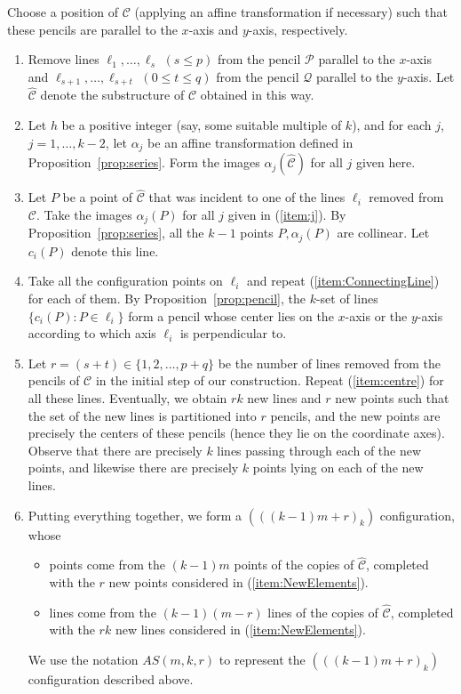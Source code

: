 \documentclass[reqno,12pt]{amsart}
\theoremstyle{plain}
\theoremstyle{definition}
\theoremstyle{remark}
\newcommand{\mc}[1]{\mathcal{#1}}
\begin{document}
Choose a position of $\mathcal C$ (applying an affine transformation if necessary) such that these pencils are parallel to the 
$x$-axis and $y$-axis, respectively. 
%
\begin{enumerate}
%
\item
Remove lines $\ell_1,\dots, \ell_s$ $(s\le p)$ from the pencil $\mc P$ parallel to the $x$-axis and $\ell_{s+1},\dots, \ell_{s+t}$ $(0 \leq t\le q)$
from the pencil $\mc Q$ parallel to the $y$-axis. Let $\widehat{\mathcal {C}}$ denote the substructure of $\mathcal C$ obtained in this way. 
%
\item \label{item:j}
Let $h$ be a positive integer (say, some suitable multiple of $k$), and for each $j$, $j=1, \dots, k-2$, let $\alpha_j$ be an
affine transformation defined in Proposition~\ref{prop:series}. Form the images $\alpha_j(\widehat{\mathcal {C}})$ for 
all $j$ given here.
%
\item\label{item:ConnectingLine}
Let $P$ be a point of $\widehat{\mathcal {C}}$ that was incident to one of the lines $\ell_i$ removed from $\mathcal C$. 
Take the images $\alpha_j(P)$ for all $j$ given in (\ref{item:j}). By Proposition~\ref{prop:series}, all the $k-1$ points 
$P, \alpha_j(P)$ are collinear. Let $c_i(P)$ denote this line.
%
\item\label{item:centre}
Take all the configuration points on $\ell_i$ and repeat (\ref{item:ConnectingLine}) for each of them. By Proposition~\ref{prop:pencil},
the $k$-set of lines $\{c_i(P): P\in \ell_i\}$ form a pencil whose center lies on the $x$-axis or the $y$-axis according to which axis $\ell_i$ is 
perpendicular to. %
%
\item \label{item:NewElements}
Let $r=(s+t)\in\{1,2, \dots, p+q\}$ be the number of lines removed from the pencils of $\mathcal C$ in the initial step of our construction. 
Repeat (\ref{item:centre}) for all these lines. Eventually, we obtain $rk$ new lines and $r$ new points such that the set of the new
lines is partitioned into $r$ pencils, and  the new points are precisely the centers of these pencils (hence they lie on the coordinate 
axes). Observe that there are precisely $k$ lines passing through each of the new points, and likewise there are precisely $k$ points 
lying on each of the new lines.
%
\item
Putting everything together, we form a $(((k-1)m+r)_k)$ configuration, whose 
%
\begin{itemize}
\item
points come from the $(k-1)m$ points of the copies of $\widehat{\mathcal {C}}$, completed with the $r$ new points considered 
in (\ref {item:NewElements}).%
\item
lines come from the $(k-1)(m-r)$ lines of the copies of $\widehat{\mathcal{C}}$, completed with the $rk$
new lines considered in (\ref{item:NewElements}).
%
\end{itemize}

We use the notation $AS(m, k, r)$ to represent the $(((k-1)m+r)_k)$ configuration described above.
%
\end{enumerate}
%
\end{document}
